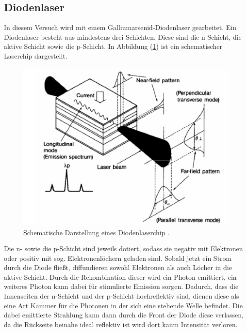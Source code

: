 \subsection{Diodenlaser}
In diesem Versuch wird mit einem Galliumarsenid-Diodenlaser gearbeitet. Ein Diodenlaser besteht aus mindestens drei Schichten. Diese sind die n-Schicht, die aktive Schicht sowie die p-Schicht.
In Abbildung (\ref{fig:diod}) ist ein schematischer Laserchip dargestellt.
\begin{figure}[h!]
  \centering
  \includegraphics[scale=0.7]{fig/diod.png}
  \caption{Schematische Darstellung eines Diodenlaserchip \cite[3]{Anleitung}.}
  \label{fig:diod}
\end{figure}
\FloatBarrier
\noindent Die n- sowie die p-Schicht sind jeweils dotiert, sodass sie negativ mit Elektronen oder positiv mit sog. Elektronenlöchern geladen sind. Sobald jetzt ein Strom durch die Diode fließt, diffundieren sowohl Elektronen als auch Löcher in die aktive Schicht. Durch die Rekombination dieser wird ein Photon emittiert, ein weiteres Photon kann dabei für stimulierte Emission sorgen.
Dadurch, dass die Innenseiten der n-Schicht und der p-Schicht hochreflektiv sind, dienen diese als eine Art Kammer für die Photonen in der sich eine stehende Welle befindet.
Die dabei emittierte Strahlung kann dann durch die Front der Diode diese verlassen, da die Rückseite beinahe ideal reflektiv ist wird dort kaum Intensität verloren.\\

